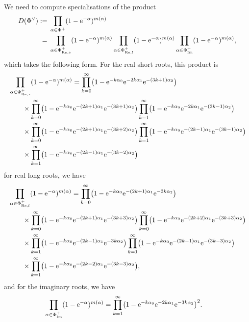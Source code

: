 \documentclass[10pt,a4paper]{amsart}
\numberwithin{equation}{section}
\theoremstyle{definition}
\begin{document}
We need to compute specialisations of the product
\begin{align*}
D(\Phi^\vee):={}&\prod_{\alpha \in \Phi^+} (1 - {\rm e}^{-\alpha})^{m(\alpha)} \\
={}&
\prod_{\alpha \in \Phi_{\mathrm{Re},s}^+} (1 - {\rm e}^{-\alpha})^{m(\alpha)}
\prod_{\alpha \in \Phi_{\mathrm{Re},l}^+} (1 - {\rm e}^{-\alpha})^{m(\alpha)}
\prod_{\alpha \in \Phi_{\mathrm{Im}}^+} (1 - {\rm e}^{-\alpha})^{m(\alpha)},
\end{align*}
which takes the following form. For the real short roots, this product is
\begin{align*}
&\prod_{\alpha \in \Phi_{\mathrm{Re},s}^+}(1 - {\rm e}^{-\alpha})^{m(\alpha)}
=\prod_{k=0}^{\infty} \bigl(1 - {\rm e}^{-k\alpha_0} {\rm e}^{-2k\alpha_1} {\rm e}^{-(3k+1)\alpha_2}\bigr)
\\
&\qquad{} \times \prod_{k=0}^{\infty} \bigl(1 - {\rm e}^{-k\alpha_0} {\rm e}^{-(2k+1)\alpha_1} {\rm e}^{-(3k+1)\alpha_2}\bigr)
\prod_{k=1}^{\infty} \bigl(1 - {\rm e}^{-k\alpha_0} {\rm e}^{-2k\alpha_1} {\rm e}^{-(3k-1)\alpha_2}\bigr) \\
&\qquad{} \times \prod_{k=0}^{\infty} \bigl(1 - {\rm e}^{-k\alpha_0} {\rm e}^{-(2k+1)\alpha_1} {\rm e}^{-(3k+2)\alpha_2}\bigr)\prod_{k=1}^{\infty} \bigl(1 - {\rm e}^{-k\alpha_0} {\rm e}^{-(2k-1)\alpha_1} {\rm e}^{-(3k-1)\alpha_2}\bigr)\\
&\qquad{}\times \prod_{k=1}^{\infty} \bigl(1 - {\rm e}^{-k\alpha_0} {\rm e}^{-(2k-1)\alpha_1} {\rm e}^{-(3k-2)\alpha_2}\bigr)
\end{align*}
for real long roots, we have
\begin{align*}
&\prod_{\alpha \in \Phi_{\mathrm{Re},l}^+} (1 - {\rm e}^{-\alpha})^{m(\alpha)}
=\prod_{k=0}^{\infty} \bigl(1 - {\rm e}^{-k\alpha_0} {\rm e}^{-(2k+1)\alpha_1} {\rm e}^{-3k\alpha_2}\bigr) \\
&\qquad \times \prod_{k=0}^{\infty} \bigl(1 - {\rm e}^{-k\alpha_0} {\rm e}^{-(2k+1)\alpha_1} {\rm e}^{-(3k+3)\alpha_2}\bigr)\prod_{k=0}^{\infty} \bigl(1 - {\rm e}^{-k\alpha_0} {\rm e}^{-(2k+2)\alpha_1} {\rm e}^{-(3k+3)\alpha_2}\bigr)\\
&\qquad{} \times \prod_{k=1}^{\infty} \bigl(1 - {\rm e}^{-k\alpha_0} {\rm e}^{-(2k-1)\alpha_1} {\rm e}^{-3k\alpha_2}\bigr)\prod_{k=1}^{\infty} \bigl(1 - {\rm e}^{-k\alpha_0} {\rm e}^{-(2k-1)\alpha_1} {\rm e}^{-(3k-3)\alpha_2}\bigr) \\
&\qquad{} \times \prod_{k=1}^{\infty} \bigl(1 - {\rm e}^{-k\alpha_0} {\rm e}^{-(2k-2)\alpha_1} {\rm e}^{-(3k-3)\alpha_2}\bigr),
\end{align*}
and for the imaginary roots, we have
\begin{align*}
\prod_{\alpha \in \Phi_{\mathrm{Im}}^+} (1 - {\rm e}^{-\alpha} )^{m(\alpha)}
&=
\prod_{k=1}^{\infty} \bigl(1 - {\rm e}^{-k\alpha_0} {\rm e}^{-2k\alpha_1} {\rm e}^{-3k\alpha_2}\bigr)^2.
\end{align*}
\end{document}
